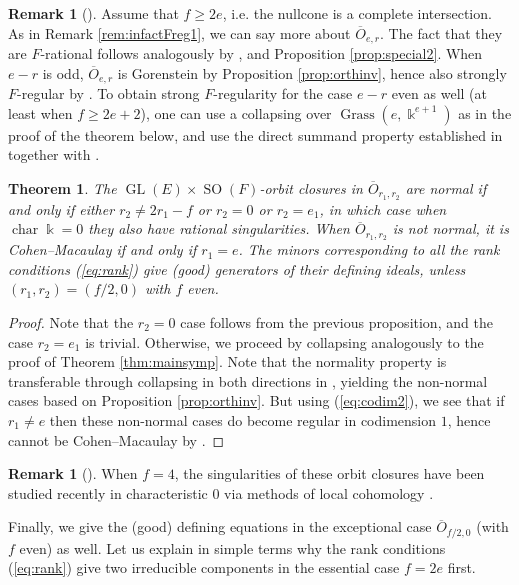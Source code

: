 \documentclass[11pt]{amsart}
\numberwithin{equation}{section}
\newtheorem{theorem}[equation]{Theorem}
\theoremstyle{definition}
\newtheorem{rmk}[equation]{Remark}
\newenvironment{remark}[1][]{\begin{rmk}[#1] \pushQED{\qed}}{\popQED \end{rmk}}
\DeclareMathOperator{\Gr}{Grass}
\DeclareMathOperator{\GL}{GL}
\DeclareMathOperator{\SO}{SO}
\DeclareMathOperator{\cha}{char}
\newcommand{\ol}{\overline}
\newcommand{\kk}{\Bbbk}
\begin{document}
\begin{remark}\label{rem:infactFreg2}
Assume that $f\geq 2e$, i.e. the nullcone is a complete intersection. As in Remark \ref{rem:infactFreg1}, we can say more about $\ol{O}_{e,r}$. The fact that they are $F$-rational follows analogously by \cite[Theorem 4.3]{aberenes}, \cite[Section 4.1]{me} and Proposition \ref{prop:special2}. When $e-r$ is odd,  $\ol{O}_{e,r}$ is Gorenstein by Proposition \ref{prop:orthinv}, hence also strongly $F$-regular by \cite[Corollary 4.7]{hh}. To obtain strong $F$-regularity for the case $e-r$ even as well (at least when $f\geq 2e+2$), one can use a collapsing over $\Gr(e,\kk^{e+1})$ as in the proof of the theorem below, and use the direct summand property established in \cite[Proposition 3.4]{me} together with \cite[Theorem 5.5]{hh}.
\end{remark}

\begin{theorem} \label{thm:mainorth}
The $\GL(E)\times \SO(F)$-orbit closures in $\ol{O}_{r_1, r_2}$ are normal if and only if either $r_2\neq 2 r_1 - f$ or $r_2=0$ or $r_2=e_1$, in which case when $\cha \kk = 0$ they also have rational singularities. When  $\ol{O}_{r_1, r_2}$ is not normal, it is Cohen--Macaulay if and only if $r_1=e$. The minors corresponding to all the rank conditions (\ref{eq:rank}) give (good) generators of their defining ideals, unless $(r_1, r_2)=(f/2, 0)$ with $f$ even.
\end{theorem}

\begin{proof}
Note that the $r_2=0$ case follows from the previous proposition, and the case $r_2=e_1$ is trivial. Otherwise, we proceed by collapsing analogously to the proof of Theorem \ref{thm:mainsymp}. Note that the normality property is transferable through collapsing in both directions in \cite[Theorem 1.4]{me}, yielding the non-normal cases based on Proposition \ref{prop:orthinv}. But using (\ref{eq:codim2}), we see that if $r_1\neq e$ then these non-normal cases do become regular in codimension $1$, hence cannot be Cohen--Macaulay by \cite[Theorem 8.22A]{hartshorne}.
\end{proof}


\begin{remark}
When $f=4$, the singularities of these orbit closures have been studied recently in characteristic $0$ via methods of local cohomology \cite[Corollary 6.2 and Remark 6.3]{lorper}.
\end{remark}

Finally, we give the (good) defining equations in the exceptional case $\ol{O}_{f/2,0}$ (with $f$ even) as well. Let us explain in simple terms why the rank conditions (\ref{eq:rank}) give two irreducible components in the essential case $f=2e$ first.
\end{document}
